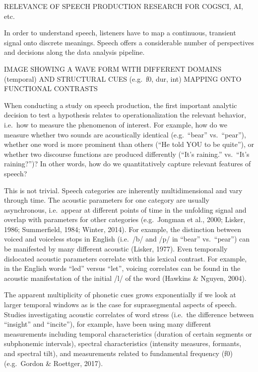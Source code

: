 \documentclass[
  english,
  man]{apa6}
\begin{document}
RELEVANCE OF SPEECH PRODUCTION RESEARCH FOR COGSCI, AI, etc.

In order to understand speech, listeners have to map a continuous, transient signal onto discrete meanings.
Speech offers a considerable number of perspectives and decisions along the data analysis pipeline.

IMAGE SHOWING A WAVE FORM WITH DIFFERENT DOMAINS (temporal) AND STRUCTURAL CUES (e.g.~f0, dur, int) MAPPING ONTO FUNCTIONAL CONTRASTS

When conducting a study on speech production, the first important analytic decision to test a hypothesis relates to operationalization the relevant behavior, i.e.~how to measure the phenomenon of interest.
For example, how do we measure whether two sounds are acoustically identical (e.g.~\enquote{bear} vs.~\enquote{pear}), whether one word is more prominent than others (\enquote{He told YOU to be quite}), or whether two discourse functions are produced differently (\enquote{It's raining.} vs.~\enquote{It's raining?})?
In other words, how do we quantitatively capture relevant features of speech?

This is not trivial.
Speech categories are inherently multidimensional and vary through time.
The acoustic parameters for one category are usually asynchronous, i.e.~appear at different points of time in the unfolding signal and overlap with parameters for other categories (e.g.~Jongman et al., 2000; Lisker, 1986; Summerfield, 1984; Winter, 2014).
For example, the distinction between voiced and voiceless stops in English (i.e.~/b/ and /p/ in \enquote{bear} vs.~\enquote{pear}) can be manifested by many different acoustic (Lisker, 1977).
Even temporally dislocated acoustic parameters correlate with this lexical contrast.
For example, in the English words \enquote{led} versus \enquote{let}, voicing correlates can be found in the acoustic manifestation of the initial /l/ of the word (Hawkins \& Nguyen, 2004).

The apparent multiplicity of phonetic cues grows exponentially if we look at larger temporal windows as is the case for suprasegmental aspects of speech.
Studies investigating acoustic correlates of word stress (i.e.~the difference between \enquote{insight} and \enquote{incite}), for example, have been using many different measurements including temporal characteristics (duration of certain segments or subphonemic intervals), spectral characteristics (intensity measures, formants, and spectral tilt), and measurements related to fundamental frequency (f0) (e.g.~Gordon \& Roettger, 2017).
\end{document}

